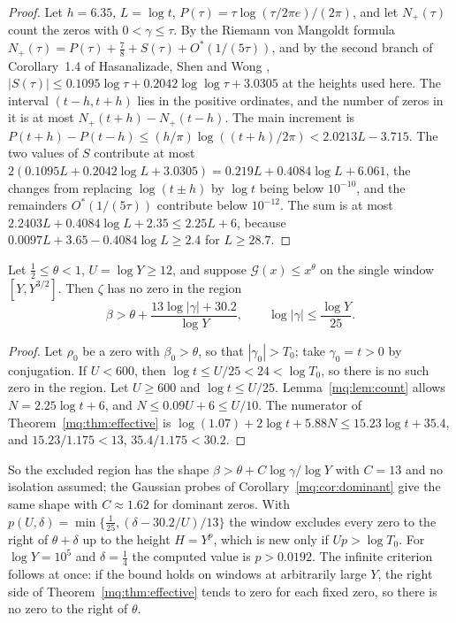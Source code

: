 \begin{proof}
Let $h=6.35$, $L=\log t$, $P(\tau)=\tau\log(\tau/2\pi e)/(2\pi)$, and let $N_+(\tau)$ count the zeros with $0<\gamma\le\tau$. By the Riemann von Mangoldt formula $N_+(\tau)=P(\tau)+\frac78+S(\tau)+O^*(1/(5\tau))$, and by the second branch of Corollary~1.4 of Hasanalizade, Shen and Wong \cite{HSW22}, $|S(\tau)|\le0.1095\log\tau+0.2042\log\log\tau+3.0305$ at the heights used here. The interval $(t-h,t+h)$ lies in the positive ordinates, and the number of zeros in it is at most $N_+(t+h)-N_+(t-h)$. The main increment is $P(t+h)-P(t-h)\le(h/\pi)\log((t+h)/2\pi)<2.0213L-3.715$. The two values of $S$ contribute at most $2(0.1095L+0.2042\log L+3.0305)=0.219L+0.4084\log L+6.061$, the changes from replacing $\log(t\pm h)$ by $\log t$ being below $10^{-10}$, and the remainders $O^*(1/(5\tau))$ contribute below $10^{-12}$. The sum is at most $2.2403L+0.4084\log L+2.35\le2.25L+6$, because $0.0097L+3.65-0.4084\log L\ge2.4$ for $L\ge28.7$.
\end{proof}

\begin{corollary}\label{mq:cor:region}
Let $\frac12\le\theta<1$, $U=\log Y\ge12$, and suppose $\mathcal G(x)\le x^\theta$ on the single window $[Y,Y^{3/2}]$. Then $\zeta$ has no zero in the region
\[
\beta>\theta+\frac{13\log|\gamma|+30.2}{\log Y},\qquad \log|\gamma|\le\frac{\log Y}{25}.
\]
\end{corollary}

\begin{proof}
Let $\rho_0$ be a zero with $\beta_0>\theta$, so that $|\gamma_0|>T_0$; take $\gamma_0=t>0$ by conjugation. If $U<600$, then $\log t\le U/25<24<\log T_0$, so there is no such zero in the region. Let $U\ge600$ and $\log t\le U/25$. Lemma~\ref{mq:lem:count} allows $N=2.25\log t+6$, and $N\le0.09U+6\le U/10$. The numerator of Theorem~\ref{mq:thm:effective} is $\log(1.07)+2\log t+5.88N\le15.23\log t+35.4$, and $15.23/1.175<13$, $35.4/1.175<30.2$.
\end{proof}

So the excluded region has the shape $\beta>\theta+C\log\gamma/\log Y$ with $C=13$ and no isolation assumed; the Gaussian probes of Corollary~\ref{mq:cor:dominant} give the same shape with $C\approx1.62$ for dominant zeros. With $p(U,\delta)=\min\{\frac1{25},(\delta-30.2/U)/13\}$ the window excludes every zero to the right of $\theta+\delta$ up to the height $H=Y^{p}$, which is new only if $Up>\log T_0$. For $\log Y=10^5$ and $\delta=\frac14$ the computed value is $p>0.0192$.
The infinite criterion follows at once: if the bound holds on windows at arbitrarily large $Y$, the right side of Theorem~\ref{mq:thm:effective} tends to zero for each fixed zero, so there is no zero to the right of $\theta$.

